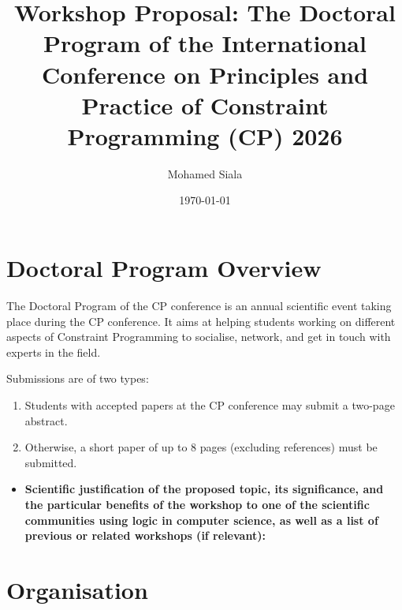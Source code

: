 \documentclass[12pt,a4paper]{article}
\title{Workshop Proposal: The Doctoral Program of the International Conference on Principles and Practice of Constraint Programming (CP) 2026}
\author{Mohamed Siala}
\date{\today}
\begin{document}
\maketitle


\section{Doctoral Program Overview}

The Doctoral Program of the CP conference is an annual scientific event taking place during
the CP conference.
It aims at helping students working on different aspects of Constraint Programming to
socialise, network, and get in touch with experts in the field.


Submissions are of two types:
\begin{enumerate}
	\item Students with accepted papers at the CP conference may submit a two-page abstract.
	\item Otherwise, a short paper of up to 8 pages (excluding references) must be submitted.
\end{enumerate}



\begin{itemize}
	\item \textbf{Scientific justification of the proposed topic, its significance, and the particular benefits of the workshop to one of the scientific communities using logic in computer science, as well as a list of previous or related workshops (if relevant):}

\end{itemize}


\section{Organisation}
\end{document}
